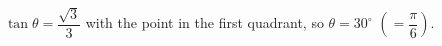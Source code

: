 $\tan\theta=\dfrac{\sqrt3}{3}$ with the point in the first quadrant, so $\theta=\boxed{30^\circ}$ $\left(=\dfrac\pi6\right)$.
